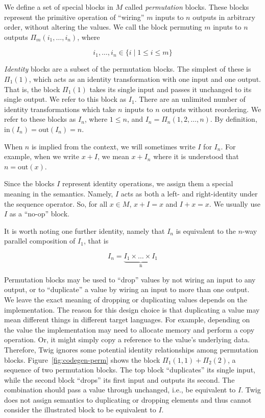 We define a set of special blocks in $M$ called \emph{permutation}
blocks. These blocks represent the primitive operation of
``wiring'' $m$ inputs to $n$ outputs in arbitrary order, without
altering the values. We call the block permuting $m$ inputs to $n$
outputs $\Pi_m(i_1,\ldots,i_n)$, where

\[
i_1,\ldots,i_n \in \lbrace i \;|\; 1 \leq i \leq m \rbrace
\]

\emph{Identity} blocks are a subset of the permutation blocks. The
simplest of these is $\Pi_1(1)$, which acts as an identity
transformation with one input and one output. That is, the block
$\Pi_1(1)$ takes its single input and passes it unchanged to its
single output. We refer to this block as $I_1$. There are an
unlimited number of identity transformations which take $n$ inputs
to $n$ outputs without reordering. We refer to these blocks as
$I_n$, where $1 \leq n$, and $I_n = \Pi_n(1,2,\ldots,n)$. By
definition, $\mbox{in}(I_n) = \mbox{out}(I_n) = n$.

When $n$ is implied from the context, we will sometimes write $I$
for $I_n$. For example, when we write $x+I$, we mean $x+I_n$ where
it is understood that $n = \mbox{out}(x)$.

Since the blocks $I$ represent identity operations, we assign them
a special meaning in the semantics. Namely, $I$ acts as both a
left- and right-identity under the sequence operator. So, for all
$x \in M$, $x + I = x$ and $I + x = x$. We usually use $I$ as a
``no-op'' block.

It is worth noting one further identity, namely that $I_n$ is
equivalent to the $n$-way parallel composition of $I_1$, that is

\[
I_n = \underbrace{I_1 \times \ldots \times I_1}_\text{n}
\]

% 
% 

Permutation blocks may be used to ``drop'' values by not wiring an input to
any output, or to ``duplicate'' a value by wiring an input to more than one
output. We leave the exact meaning of dropping or duplicating values depends
on the implementation. The reason for this design choice is that duplicating a
value may mean different things in different target languages. For example,
depending on the value the implementation may need to allocate memory and
perform a copy operation. Or, it might simply copy a reference to the value's
underlying data. Therefore, Twig ignores some potential identity relationships
among permutation blocks. Figure~\ref{fig:codegen-perm} shows the block
$\Pi_1(1,1)+\Pi_2(2)$, a sequence of two permutation blocks. The top block
``duplicates'' its single input, while the second block ``drops'' its first
input and outputs its second. The combination should pass a value through
unchanged, i.e., be equivalent to $I$. Twig does not assign semantics to
duplicating or dropping elements and thus cannot consider the illustrated
block to be equivalent to $I$.


